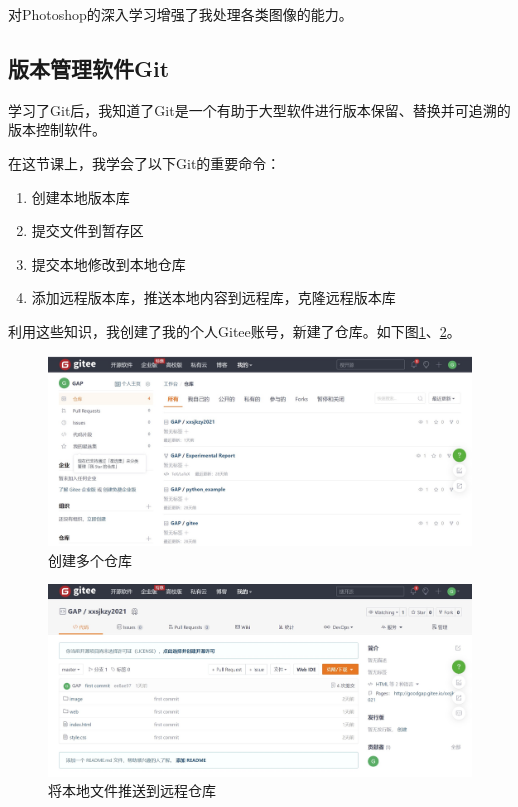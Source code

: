 \documentclass[supercite]{Experimental_Report}
\theoremstyle{definition}
\begin{document}
		对Photoshop的深入学习增强了我处理各类图像的能力。
		
	\subsection{版本管理软件Git}
	
	学习了Git后，我知道了Git是一个有助于大型软件进行版本保留、替换并可追溯的版本控制软件。
	
	在这节课上，我学会了以下Git的重要命令：
	
	\begin{enumerate}
		\renewcommand{\labelenumi}{\theenumi)}
		\item 创建本地版本库
		\item 提交文件到暂存区
		\item 提交本地修改到本地仓库
		\item 添加远程版本库，推送本地内容到远程库，克隆远程版本库
	\end{enumerate}	

	利用这些知识，我创建了我的个人Gitee账号，新建了仓库。如下图\ref{fig5-1}、\ref{fig5-2}。
	
	\begin{figure}[htb]
		\begin{center}
			\includegraphics[scale=0.43]{images/5-1.jpg}
			\caption{创建多个仓库}
			\label{fig5-1}
		\end{center}
	\end{figure}
	
	\begin{figure}[htb]
		\begin{center}
			\includegraphics[scale=0.43]{images/5-2.jpg}
			\caption{将本地文件推送到远程仓库}
			\label{fig5-2}
		\end{center}
	\end{figure}
\end{document}
